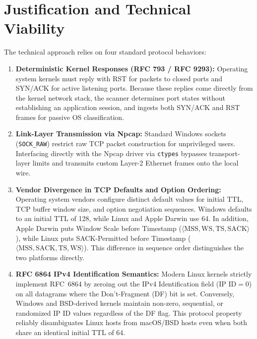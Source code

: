\documentclass[11pt,a4paper]{article}
\begin{document}
\section{Justification and Technical Viability}

The technical approach relies on four standard protocol behaviors:
\begin{enumerate}[nosep, itemsep=3pt, leftmargin=1.4em]
    \item \textbf{Deterministic Kernel Responses (RFC 793 / RFC 9293):} Operating system kernels must reply with RST for packets to closed ports and SYN/ACK for active listening ports. Because these replies come directly from the kernel network stack, the scanner determines port states without establishing an application session, and ingests both SYN/ACK and RST frames for passive OS classification.
    \item \textbf{Link-Layer Transmission via Npcap:} Standard Windows sockets (\texttt{SOCK\_RAW}) restrict raw TCP packet construction for unprivileged users. Interfacing directly with the Npcap driver via \texttt{ctypes} bypasses transport-layer limits and transmits custom Layer-2 Ethernet frames onto the local wire.
    \item \textbf{Vendor Divergence in TCP Defaults and Option Ordering:} Operating system vendors configure distinct default values for initial TTL, TCP buffer window size, and option negotiation sequences. Windows defaults to an initial TTL of 128, while Linux and Apple Darwin use 64. In addition, Apple Darwin puts Window Scale before Timestamp ($\langle\text{MSS}, \text{WS}, \text{TS}, \text{SACK}\rangle$), while Linux puts SACK-Permitted before Timestamp ($\langle\text{MSS}, \text{SACK}, \text{TS}, \text{WS}\rangle$). This difference in sequence order distinguishes the two platforms directly.
    \item \textbf{RFC 6864 IPv4 Identification Semantics:} Modern Linux kernels strictly implement RFC~6864 by zeroing out the IPv4 Identification field ($\text{IP ID} = 0$) on all datagrams where the Don't-Fragment (DF) bit is set. Conversely, Windows and BSD-derived kernels maintain non-zero, sequential, or randomized IP ID values regardless of the DF flag. This protocol property reliably disambiguates Linux hosts from macOS/BSD hosts even when both share an identical initial TTL of 64.
\end{enumerate}
\end{document}
